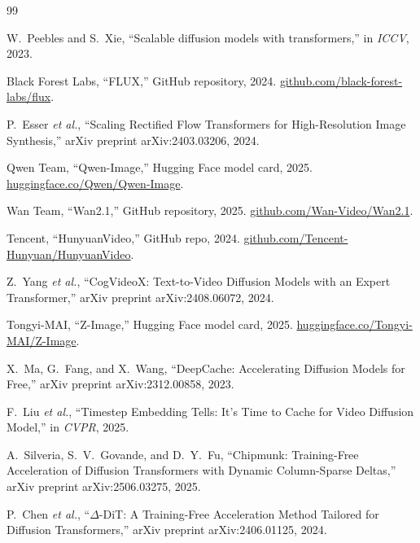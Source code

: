 \documentclass[10pt]{article}
\begin{document}
\sloppy
\begin{thebibliography}{99}

W.~Peebles and S.~Xie, ``Scalable diffusion models with transformers,'' in \textit{ICCV}, 2023.

Black Forest Labs, ``FLUX,'' GitHub repository, 2024. \href{https://github.com/black-forest-labs/flux}{github.com/black-forest-labs/flux}.

P.~Esser \textit{et al.}, ``Scaling Rectified Flow Transformers for High-Resolution Image Synthesis,'' arXiv preprint arXiv:2403.03206, 2024.

Qwen Team, ``Qwen-Image,'' Hugging Face model card, 2025. \href{https://huggingface.co/Qwen/Qwen-Image}{huggingface.co/Qwen/Qwen-Image}.

Wan Team, ``Wan2.1,'' GitHub repository, 2025. \href{https://github.com/Wan-Video/Wan2.1}{github.com/Wan-Video/Wan2.1}.

Tencent, ``HunyuanVideo,'' GitHub repo, 2024. \href{https://github.com/Tencent-Hunyuan/HunyuanVideo}{github.com/Tencent-Hunyuan/HunyuanVideo}.

Z.~Yang \textit{et al.}, ``CogVideoX: Text-to-Video Diffusion Models with an Expert Transformer,'' arXiv preprint arXiv:2408.06072, 2024.

Tongyi-MAI, ``Z-Image,'' Hugging Face model card, 2025. \href{https://huggingface.co/Tongyi-MAI/Z-Image}{huggingface.co/Tongyi-MAI/Z-Image}.

X.~Ma, G.~Fang, and X.~Wang, ``DeepCache: Accelerating Diffusion Models for Free,'' arXiv preprint arXiv:2312.00858, 2023.

F.~Liu \textit{et al.}, ``Timestep Embedding Tells: It's Time to Cache for Video Diffusion Model,'' in \textit{CVPR}, 2025.

A.~Silveria, S.~V.~Govande, and D.~Y.~Fu, ``Chipmunk: Training-Free Acceleration of Diffusion Transformers with Dynamic Column-Sparse Deltas,'' arXiv preprint arXiv:2506.03275, 2025.

P.~Chen \textit{et al.}, ``$\Delta$-DiT: A Training-Free Acceleration Method Tailored for Diffusion Transformers,'' arXiv preprint arXiv:2406.01125, 2024.


\end{thebibliography}
\end{document}
